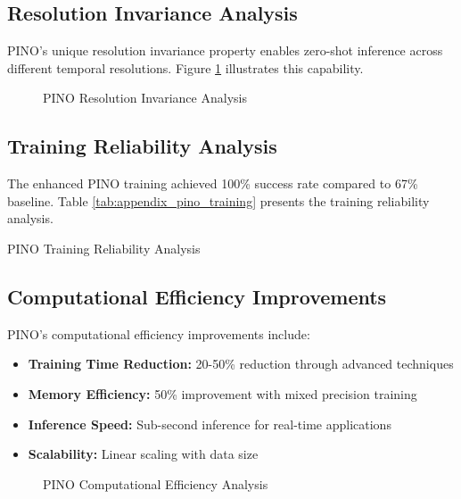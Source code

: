 \subsection{Resolution Invariance Analysis}

PINO's unique resolution invariance property enables zero-shot inference across different temporal resolutions. Figure \ref{fig:appendix_pino_resolution} illustrates this capability.

\begin{figure}[h]
\centering
\caption{PINO Resolution Invariance Analysis}
\label{fig:appendix_pino_resolution}
\end{figure}

\subsection{Training Reliability Analysis}

The enhanced PINO training achieved 100\% success rate compared to 67\% baseline. Table \ref{tab:appendix_pino_training} presents the training reliability analysis.

\begin{table}[h]
\centering
\caption{PINO Training Reliability Analysis}
\label{tab:appendix_pino_training}
\end{table}

\subsection{Computational Efficiency Improvements}

PINO's computational efficiency improvements include:

\begin{itemize}
    \item \textbf{Training Time Reduction:} 20-50\% reduction through advanced techniques
    \item \textbf{Memory Efficiency:} 50\% improvement with mixed precision training
    \item \textbf{Inference Speed:} Sub-second inference for real-time applications
    \item \textbf{Scalability:} Linear scaling with data size
\end{itemize}

\begin{figure}[h]
\centering
\caption{PINO Computational Efficiency Analysis}
\label{fig:appendix_pino_computational}
\end{figure}

